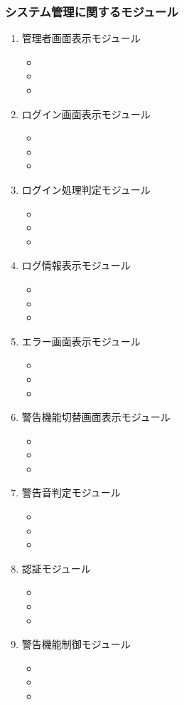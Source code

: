 \subsubsection{システム管理に関するモジュール}
\begin{enumerate}
\renewcommand{\labelenumi}{(\arabic{enumi})}
\item 管理者画面表示モジュール
\begin{itemize}
\item 
\item 
\item
\end{itemize}
\item ログイン画面表示モジュール
\begin{itemize}
\item 
\item 
\item
\end{itemize}
\item ログイン処理判定モジュール
\begin{itemize}
\item 
\item 
\item
\end{itemize}
\item ログ情報表示モジュール
\begin{itemize}
\item 
\item 
\item
\end{itemize}
\item エラー画面表示モジュール
\begin{itemize}
\item 
\item 
\item
\end{itemize}
\item 警告機能切替画面表示モジュール
\begin{itemize}
\item 
\item 
\item
\end{itemize}
\item 警告音判定モジュール
\begin{itemize}
\item 
\item 
\item
\end{itemize}
\item 認証モジュール
\begin{itemize}
\item 
\item 
\item
\end{itemize}
\item 警告機能制御モジュール
\begin{itemize}
\item 
\item 
\item
\end{itemize}
\end{enumerate}
